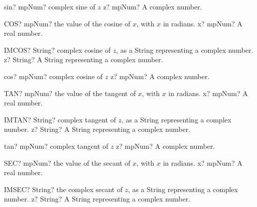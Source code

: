 \documentclass[12pt,a4paper,openany]{book}
\begin{document}
\begin{mpFunctionsExtract}
\mpFunctionOne
{sin? mpNum? complex sine of $z$}
{z? mpNum? A complex number.}
\end{mpFunctionsExtract}

\begin{mpFunctionsExtract}
\mpWorksheetFunctionOneNotImplemented
{COS? mpNum? the value of the cosine of $x$, with $x$ in radians.}
{x? mpNum? A real number.}
\end{mpFunctionsExtract}

\begin{mpFunctionsExtract}
\mpWorksheetFunctionOneNotImplemented
{IMCOS? String? complex cosine of $z$, as a String representing a complex number.}
{z? String? A String representing a complex number.}
\end{mpFunctionsExtract}

\begin{mpFunctionsExtract}
\mpFunctionOne
{cos? mpNum? complex cosine of $z$}
{z? mpNum? A complex number.}
\end{mpFunctionsExtract}

\begin{mpFunctionsExtract}
\mpWorksheetFunctionOneNotImplemented
{TAN? mpNum? the value of the tangent of $x$, with $x$ in radians.}
{x? mpNum? A real number.}
\end{mpFunctionsExtract}

\begin{mpFunctionsExtract}
\mpWorksheetFunctionOneNotImplemented
{IMTAN? String? complex tangent of $z$, as a String representing a complex number.}
{z? String? A String representing a complex number.}
\end{mpFunctionsExtract}

\begin{mpFunctionsExtract}
\mpFunctionOne
{tan? mpNum? complex tangent of $z$}
{z? mpNum? A complex number.}
\end{mpFunctionsExtract}

\begin{mpFunctionsExtract}
\mpWorksheetFunctionOneNotImplemented
{SEC? mpNum? the value of the secant of $x$, with $x$ in radians.}
{x? mpNum? A real number.}
\end{mpFunctionsExtract}

\begin{mpFunctionsExtract}
\mpWorksheetFunctionOneNotImplemented
{IMSEC? String? the complex secant of $z$, as a String representing a complex number.}
{z? String? A String representing a complex number.}
\end{mpFunctionsExtract}
\end{document}
